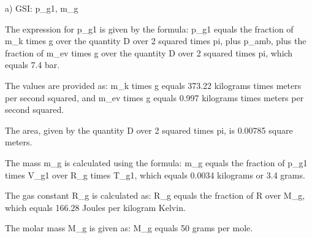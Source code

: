 a) GSI: p_g1, m_g

The expression for p_g1 is given by the formula:
p_g1 equals the fraction of m_k times g over the quantity D over 2 squared times pi, plus p_amb, plus the fraction of m_ev times g over the quantity D over 2 squared times pi, which equals 7.4 bar.

The values are provided as:
m_k times g equals 373.22 kilograms times meters per second squared, and m_ev times g equals 0.997 kilograms times meters per second squared.

The area, given by the quantity D over 2 squared times pi, is 0.00785 square meters.

The mass m_g is calculated using the formula:
m_g equals the fraction of p_g1 times V_g1 over R_g times T_g1, which equals 0.0034 kilograms or 3.4 grams.

The gas constant R_g is calculated as:
R_g equals the fraction of R over M_g, which equals 166.28 Joules per kilogram Kelvin.

The molar mass M_g is given as:
M_g equals 50 grams per mole.